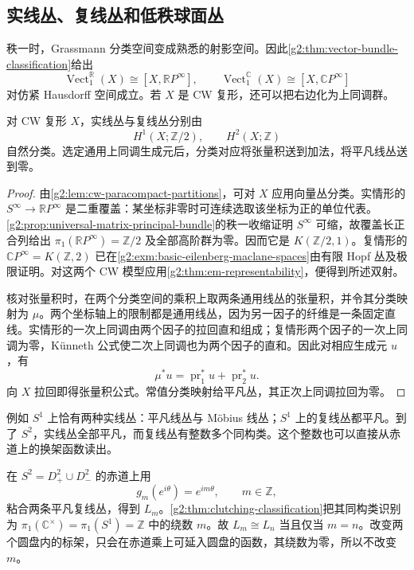 \subsection{实线丛、复线丛和低秩球面丛}
\label{g2:subsec:1904:03}

秩一时，Grassmann 分类空间变成熟悉的射影空间。因此\cref{g2:thm:vector-bundle-classification}给出
\[
	\operatorname{Vect}_1^{\mathbb R}(X)\cong[X,\mathbb RP^\infty],\qquad
	\operatorname{Vect}_1^{\mathbb C}(X)\cong[X,\mathbb CP^\infty]
\]
对仿紧 Hausdorff 空间成立。若 \(X\) 是 CW 复形，还可以把右边化为上同调群。

\begin{proposition}\label{g2:prop:line-bundle-cohomology-classification}
	对 CW 复形 \(X\)，实线丛与复线丛分别由
	\[
		H^1(X;\mathbb Z/2),\qquad H^2(X;\mathbb Z)
	\]
	自然分类。选定通用上同调生成元后，分类对应将张量积送到加法，将平凡线丛送到零。
\end{proposition}
\begin{proof}
	由\cref{g2:lem:cw-paracompact-partitions}，可对 \(X\) 应用向量丛分类。实情形的 \(S^\infty\to\mathbb RP^\infty\) 是二重覆盖：某坐标非零时可连续选取该坐标为正的单位代表。\cref{g2:prop:universal-matrix-principal-bundle}的秩一收缩证明 \(S^\infty\) 可缩，故覆盖长正合列给出 \(\pi_1(\mathbb RP^\infty)=\mathbb Z/2\) 及全部高阶群为零。因而它是 \(K(\mathbb Z/2,1)\)。复情形的 \(\mathbb CP^\infty=K(\mathbb Z,2)\) 已在\cref{g2:exm:basic-eilenberg-maclane-spaces}由有限 Hopf 丛及极限证明。对这两个 CW 模型应用\cref{g2:thm:em-representability}，便得到所述双射。

	核对张量积时，在两个分类空间的乘积上取两条通用线丛的张量积，并令其分类映射为 \(\mu\)。两个坐标轴上的限制都是通用线丛，因为另一因子的纤维是一条固定直线。实情形的一次上同调由两个因子的拉回直和组成；复情形两个因子的一次上同调为零，Künneth 公式使二次上同调也为两个因子的直和。因此对相应生成元 \(u\)，有
	\[
		\mu^*u=\operatorname{pr}_1^*u+\operatorname{pr}_2^*u.
	\]
	向 \(X\) 拉回即得张量积公式。常值分类映射给平凡丛，其正次上同调拉回为零。
\end{proof}

例如 \(S^1\) 上恰有两种实线丛：平凡线丛与 Möbius 线丛；\(S^1\) 上的复线丛都平凡。到了 \(S^2\)，实线丛全部平凡，而复线丛有整数多个同构类。这个整数也可以直接从赤道上的换架函数读出。

\begin{example}\label{g2:exm:sphere-line-clutching}
	在 \(S^2=D_+^2\cup D_-^2\) 的赤道上用
	\[
		g_m(e^{i\theta})=e^{im\theta},\qquad m\in\mathbb Z,
	\]
	粘合两条平凡复线丛，得到 \(L_m\)。\cref{g2:thm:clutching-classification}把其同构类识别为 \(\pi_1(\mathbb C^\times)=\pi_1(S^1)=\mathbb Z\) 中的绕数 \(m\)。故 \(L_m\cong L_n\) 当且仅当 \(m=n\)。改变两个圆盘内的标架，只会在赤道乘上可延入圆盘的函数，其绕数为零，所以不改变 \(m\)。
\end{example}


